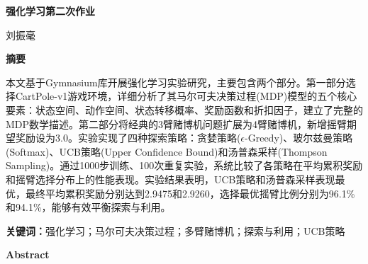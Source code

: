 \documentclass[12pt,a4paper]{article}
\begin{document}
\begin{center}
{\heiti\fontsize{22pt}{\baselineskip}\selectfont\bfseries 强化学习第二次作业}
\end{center}

\vspace{12pt}

\begin{center}
{\fontsize{14pt}{\baselineskip}\quad 刘振毫}
\end{center}

\vspace{24pt}

\begin{center}
{\heiti\fontsize{18pt}{\baselineskip}\selectfont\bfseries 摘要}
\end{center}

\vspace{18pt}

\setlength{\parindent}{2em}
\setlength{\parskip}{0pt}

本文基于Gymnasium库开展强化学习实验研究，主要包含两个部分。第一部分选择CartPole-v1游戏环境，详细分析了其马尔可夫决策过程(MDP)模型的五个核心要素：状态空间、动作空间、状态转移概率、奖励函数和折扣因子，建立了完整的MDP数学描述。第二部分将经典的3臂赌博机问题扩展为4臂赌博机，新增摇臂期望奖励设为3.0。实验实现了四种探索策略：贪婪策略($\epsilon$-Greedy)、玻尔兹曼策略(Softmax)、UCB策略(Upper Confidence Bound)和汤普森采样(Thompson Sampling)。通过1000步训练、100次重复实验，系统比较了各策略在平均累积奖励和摇臂选择分布上的性能表现。实验结果表明，UCB策略和汤普森采样表现最优，最终平均累积奖励分别达到2.9475和2.9260，选择最优摇臂比例分别为96.1\%和94.1\%，能够有效平衡探索与利用。

\vspace{12pt}

\noindent\textbf{关键词：}强化学习；马尔可夫决策过程；多臂赌博机；探索与利用；UCB策略

\vspace{24pt}

\begin{center}
{\fontsize{18pt}{\baselineskip}\selectfont\bfseries Abstract}
\end{center}

\vspace{18pt}
\end{document}
